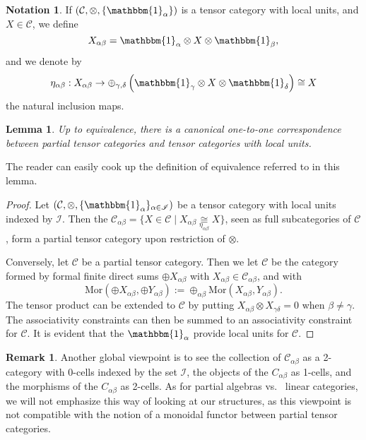 \documentclass[10pt]{article}
\newcommand{\CatC}{\mathcal{C}}
\newcommand{\CatCC}{\mathscr{C}}
\newcommand{\Mor}{\mathrm{Mor}}
\newcommand{\Unitb}{\mathbbm{1}}
\newtheorem{Lem}[Theorem]{Lemma}
\theoremstyle{definition}
\newtheorem{Rem}[Theorem]{Remark}
\newtheorem{Not}[Theorem]{Notation}
\numberwithin{equation}{section}
\begin{document}
\begin{Not} If $(\CatC,\otimes,\{\Unitb_\alpha\})$ is a tensor category with local units, and $X\in \CatC$, we define \[X_{\alpha\beta} = \Unitb_\alpha\otimes X \otimes \Unitb_\beta,\] and we denote by \[\eta_{\alpha\beta}:X_{\alpha\beta} \rightarrow \oplus_{\gamma,\delta} \left(\Unitb_\gamma \otimes X \otimes \Unitb_\delta\right) \cong X\] the natural inclusion maps. 
\end{Not}

\begin{Lem} Up to equivalence, there is a canonical one-to-one correspondence between partial tensor categories and tensor categories with local units. 
\end{Lem}

The reader can easily cook up the definition of equivalence referred to in this lemma.

\begin{proof} Let $(\CatC,\otimes,\{\Unitb_\alpha\}_{\alpha\in \mathscr{I}})$ be a tensor category with local units indexed by $\mathscr{I}$. Then the $\CatC_{\alpha\beta} = \{X \in \CatC\mid X_{\alpha\beta} \underset{\eta_{\alpha\beta}}{\cong} X\}$, seen as full subcategories of $\CatC$, form a partial tensor category upon restriction of $\otimes$.

Conversely, let $\CatCC$ be a partial tensor category. Then we let $\CatC$ be the category formed by formal finite direct sums $\oplus X_{\alpha\beta}$ with $X_{\alpha\beta}\in \CatC_{\alpha\beta}$, and with \[\Mor(\oplus X_{\alpha\beta},\oplus Y_{\alpha\beta}) := \oplus_{\alpha\beta} \Mor(X_{\alpha\beta},Y_{\alpha\beta}).\] The tensor product can be extended to $\CatC$ by putting $X_{\alpha\beta} \otimes X_{\gamma\delta} = 0$ when $\beta\neq \gamma$. The associativity constraints can then be summed to an associativity constraint for $\CatC$. It is evident that the $\Unitb_\alpha$ provide local units for $\CatC$. 
\end{proof}

\begin{Rem} Another global viewpoint is to see the collection of
  $\CatC_{\alpha\beta}$ as a 2-category with 0-cells indexed by the
  set $\mathscr{I}$, the objects of the $C_{\alpha\beta}$ as 1-cells,
  and  the morphisms of the $C_{\alpha\beta}$ as 2-cells. As for
  partial algebras vs.~ linear categories, we will not emphasize this
  way of looking at our structures, as this viewpoint is not
  compatible with the notion of a monoidal functor between partial tensor categories.
\end{Rem} 
\end{document}
